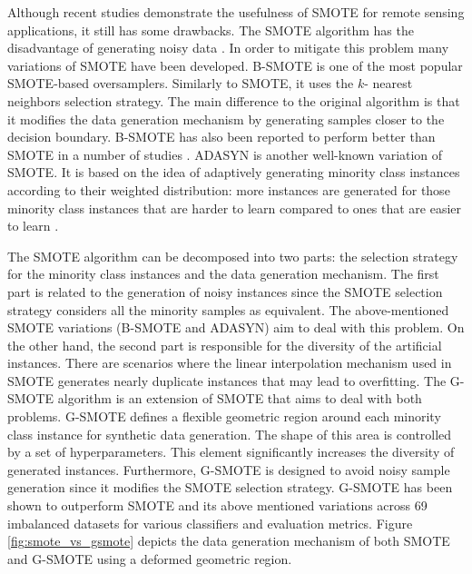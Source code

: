 \documentclass[remotesensing,article,submit,moreauthors,pdftex]{Definitions/mdpi}
\begin{document}
Although recent studies demonstrate the usefulness of SMOTE for remote sensing
applications, it still has some drawbacks. The SMOTE algorithm has the
disadvantage of generating noisy data \cite{Douzas2017}. In order to mitigate
this problem many variations of SMOTE have been developed. B-SMOTE is one of
the most popular SMOTE-based oversamplers. Similarly to SMOTE, it uses the $k$-
nearest neighbors selection strategy. The main difference to the original
algorithm is that it modifies the data generation mechanism by generating
samples closer to the decision boundary. B-SMOTE has also been reported to
perform better than SMOTE in a number of studies \cite{Nguyen2009,
Ramentol2012}. ADASYN is another well-known variation of SMOTE. It is based on
the idea of adaptively generating minority class instances according to their
weighted distribution: more instances are generated for those minority class
instances that are harder to learn compared to ones that are easier to learn
\cite{HaiboHe2008}.

The SMOTE algorithm can be decomposed into two parts: the selection strategy
for the minority class instances and the data generation mechanism. The first
part is related to the generation of noisy instances since the SMOTE selection
strategy considers all the minority samples as equivalent. The above-mentioned
SMOTE variations (B-SMOTE and ADASYN) aim to deal with this problem. On the
other hand, the second part is responsible for the diversity of the artificial
instances. There are scenarios where the linear interpolation mechanism used in
SMOTE generates nearly duplicate instances that may lead to overfitting. The G-
SMOTE algorithm is an extension of SMOTE that aims to deal with both problems.
G-SMOTE defines a flexible geometric region around each minority class instance
for synthetic data generation. The shape of this area is controlled by a set of
hyperparameters. This element significantly increases the diversity of
generated instances. Furthermore, G-SMOTE is designed to avoid noisy sample
generation since it modifies the SMOTE selection strategy. G-SMOTE has been
shown to outperform SMOTE and its above  mentioned variations across 69
imbalanced datasets for various classifiers and evaluation metrics. Figure
\ref{fig:smote_vs_gsmote} depicts the data generation mechanism of both SMOTE and
G-SMOTE using a deformed geometric region.
\end{document}
